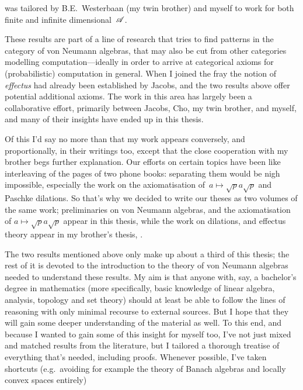 \documentclass[b5paper]{book}
\begin{document}
\begin{parsec}{10}
\begin{point}{20}
\begin{enumerate}
was tailored by B.E.~Westerbaan (my twin brother) and myself to work for
both finite and infinite dimensional~$\mathscr{A}$.
\end{enumerate}
These results
are part of a line of research that
tries to find patterns
in the category of von Neumann algebras,
that may also be cut from other categories
modelling computation---ideally in order to arrive at categorical axioms
for (probabilistic) computation in general.
When I joined the fray
the notion of \emph{effectus}\cite{newdirections} had already
been established by Jacobs,
and the two results
above offer potential additional axioms.
The work in this area has largely been a collaborative effort,
primarily between Jacobs, Cho, my twin brother, and myself,
and many of their insights have ended up in this thesis.

Of this I'd say no more
than that my work appears conversely, and proportionally,
in their writings too, except that the close cooperation
with my brother begs further explanation.
Our efforts on certain topics have been like interleaving 
of the pages of two phone books:
separating them  would be nigh impossible,
especially the work on the axiomatisation
of~$a\mapsto \sqrt{p}a\sqrt{p}$ and Paschke dilations.
So that's why we decided to write our theses
as two volumes of the same work;
preliminaries on von Neumann algebras,
and the axiomatisation of $a\mapsto \sqrt{p}a\sqrt{p}$
appear in this thesis,
while the work on dilations,
and effectus theory appear in my brother's thesis,
\cite{bas}.
\end{point}
\begin{point}{30}
The two results mentioned above only
make up 
about a third of this thesis;
the rest of it is devoted to 
the introduction to the theory of von Neumann algebras
needed to understand these results.
My aim is that anyone 
with, say, a bachelor's degree in mathematics
(more specifically, basic knowledge of linear algebra,
analysis\cite{rudin1964principles}, 
topology\cite{willard}
and set theory\cite{devlin2012joy})
should at least be able to follow the lines of reasoning
with only minimal recourse to external sources.
But I hope that they will gain some deeper understanding
of the material as well.
To this end, and because I wanted to gain some of this insight
for myself too,
I've not just mixed
and matched
results from the literature,
but I tailored a thorough treatise
of everything that's needed,
including proofs.
Whenever possible,
I've taken shortcuts
(e.g.~avoiding for example
the theory of Banach algebras
and locally convex spaces entirely)

\end{point}
\end{parsec}
\end{document}
